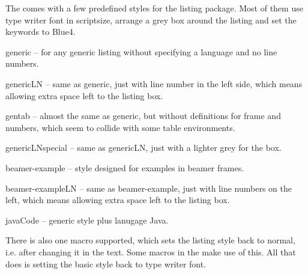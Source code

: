 
The  comes with a few predefined styles for the listing package.
Most of them use type writer font in scriptsize, arrange a grey
box around the listing and set the keywords to Blue4.
\begin{skbnotelist}
  \item generic -- for any generic listing without specifying a language and no line numbers.
  \item genericLN -- same as generic, just with line number in the left side, which means allowing extra space left to the listing box.
  \item gentab -- almost the same as generic, but without definitions for frame and numbers, which seem to collide with some table environments.
  \item genericLNspecial -- same as genericLN, just with a lighter grey for the box.
  \item beamer-example -- style designed for examples in beamer frames.
  \item beamer-exampleLN -- same as beamer-example, just with line numbers on the left, which means allowing extra space left to the listing box.
  \item javaCode -- generic style plus lanugage Java.
\end{skbnotelist}

\DescribeMacro{\lstdefinestyle}
There is also one macro supported, which sets the listing style back to normal, i.e. after changing it in the text. Some macros
in the  make use of this. All that \cmd{\lstdefinestyle} does is setting the basic style back to type writer font.